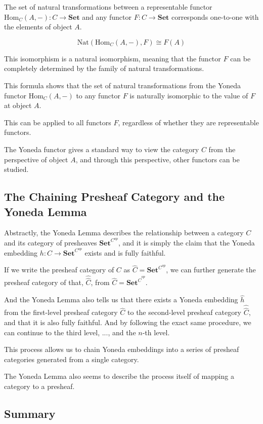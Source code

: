 \documentclass[uplatex,a4j,12pt,dvipdfmx]{jsarticle}
\begin{document}
The set of natural transformations between a representable functor $\mathrm{Hom}_C(A, -): C \to \mathbf{Set}$ and any functor $F: C \to \mathbf{Set}$ corresponds one-to-one with the elements of object $A$.

$$
	\text{Nat}(\mathrm{Hom}_C(A, -), F) \cong F(A)
$$

This isomorphism is a natural isomorphism, meaning that the functor $F$ can be completely determined by the family of natural transformations.

This formula shows that the set of natural transformations from the Yoneda functor $\mathrm{Hom}_C(A, -)$ to any functor $F$ is naturally isomorphic to the value of $F$ at object $A$.

This can be applied to all functors $F$, regardless of whether they are representable functors.

The Yoneda functor gives a standard way to view the category $C$ from the perspective of object $A$, and through this perspective, other functors can be studied.

\subsection{The Chaining Presheaf Category and the Yoneda Lemma}

Abstractly, the Yoneda Lemma describes the relationship between a category $C$ and its category of presheaves $\mathbf{Set}^{C^{op}}$, and it is simply the claim that the Yoneda embedding $h: C \to \mathbf{Set}^{C^{op}}$ exists and is fully faithful.

If we write the presheaf category of $C$ as $\hat{C} = \mathbf{Set}^{C^{op}}$, we can further generate the presheaf category of that, $\hat{\hat{C}}$, from $\hat{C} = \mathbf{Set}^{\hat{C}^{op}}$.

And the Yoneda Lemma also tells us that there exists a Yoneda embedding $\hat{h}$ from the first-level presheaf category $\hat{C}$ to the second-level presheaf category $\hat{\hat{C}}$, and that it is also fully faithful.
And by following the exact same procedure, we can continue to the third level, ..., and the $n$-th level.

This process allows us to chain Yoneda embeddings into a series of presheaf categories generated from a single category.

The Yoneda Lemma also seems to describe the process itself of mapping a category to a presheaf.


\subsection{Summary}
\end{document}
